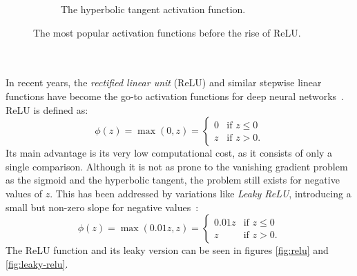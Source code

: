 \begin{figure}
\begin{subfigure}[b]{0.45\textwidth}
        \caption{The hyperbolic tangent activation function.}
        \label{fig:tanh}
    \end{subfigure}
    \caption{The most popular activation functions before the rise of ReLU.}
    \label{fig:tanhsigmoid}
\end{figure}
\\
\\
In recent years, the \textit{rectified linear unit} (ReLU) and similar stepwise linear functions have become the go-to activation functions for deep neural networks~\cite[chapter 6.3.2]{goodfellow_deep_2016}\cite{dubey_activation_2022}.
ReLU is defined as:
\begin{equation}
    \phi(z) = \max(0, z) = \begin{cases}
        0 & \text{if } z \leq 0 \\
        z & \text{if } z > 0 \text{.}
    \end{cases}
    \label{eq:relu}
\end{equation}
Its main advantage is its very low computational cost, as it consists of only a single comparison.
Although it is not as prone to the vanishing gradient problem as the sigmoid and the hyperbolic tangent, the problem still exists for negative values of $z$.
This has been addressed by variations like \textit{Leaky ReLU}, introducing a small but non-zero slope for negative values~\cite{dubey_activation_2022}:
\begin{equation}
    \phi(z) = \max(0.01 z, z) = \begin{cases}
        0.01 z & \text{if } z \leq 0 \\
        z & \text{if } z > 0 \text{.}
    \end{cases}
    \label{eq:leaky-relu}
\end{equation}
The ReLU function and its leaky version can be seen in figures \ref{fig:relu} and \ref{fig:leaky-relu}.
